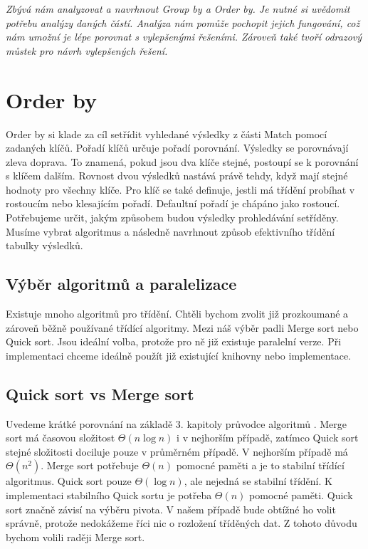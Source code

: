 \bigskip
\textit{Zbývá nám analyzovat a navrhnout Group by a Order by.
Je nutné si uvědomit potřebu analýzy daných částí.
Analýza nám pomůže pochopit jejich fungování, což nám umožní je lépe porovnat s vylepšenými řešeními. 
Zároveň také tvoří odrazový můstek pro návrh vylepšených řešení.}


\section{Order by} \label{anal.orderby}

Order by si klade za cíl setřídit vyhledané výsledky z části Match pomocí zadaných klíčů.
Pořadí klíčů určuje pořadí porovnání.
Výsledky se porovnávají zleva doprava.
To znamená, pokud jsou dva klíče stejné, postoupí se k porovnání s klíčem dalším.
Rovnost dvou výsledků nastává právě tehdy, když mají stejné hodnoty pro všechny klíče. 
Pro klíč se také definuje, jestli má třídění probíhat v rostoucím nebo klesajícím pořadí.
Defaultní pořadí je chápáno jako rostoucí. 
Potřebujeme určit, jakým způsobem budou výsledky prohledávání setříděny.
Musíme vybrat algoritmus a následně navrhnout způsob efektivního třídění tabulky výsledků.

\subsection{Výběr algoritmů a paralelizace}

Existuje mnoho algoritmů pro třídění.
Chtěli bychom zvolit již prozkoumané a zároveň běžně používané třídící algoritmy.
Mezi náš výběr padli Merge sort nebo Quick sort.
Jsou ideální volba, protože pro ně již existuje paralelní verze.
Při implementaci chceme ideálně použít již existující knihovny nebo implementace. 

\subsection{Quick sort vs Merge sort}

Uvedeme krátké porovnání na základě 3. kapitoly průvodce algoritmů \citep{labyrint}. 
Merge sort má časovou složitost $ \Theta(n\log n) $ i v nejhorším případě, zatímco Quick sort stejné složitosti dociluje pouze v průměrném případě.
V nejhorším případě má $\Theta(n^2)$.
Merge sort potřebuje $\Theta(n)$ pomocné paměti a je to stabilní třídící algoritmus.
Quick sort pouze $\Theta(\log n)$, ale nejedná se stabilní třídění.
K implementaci stabilního Quick sortu je potřeba $\Theta(n)$ pomocné paměti.
Quick sort značně závisí na výběru pivota.
V našem případě bude obtížné ho volit správně, protože nedokážeme říci nic o rozložení tříděných dat.
Z tohoto důvodu bychom volili raději Merge sort.  

